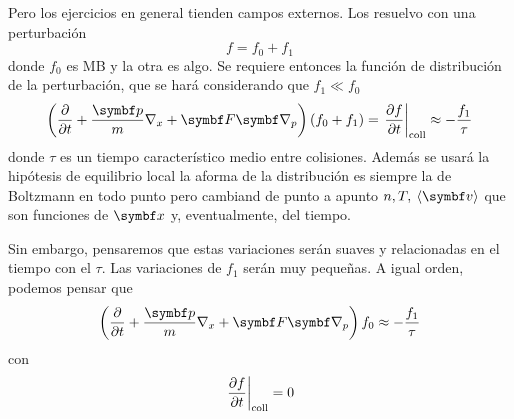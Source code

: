 \documentclass[10pt,oneside]{CBFT_book}
\begin{document}
Pero los ejercicios en general tienden campos externos. Los resuelvo con una perturbación
\[
	f = f_0 + f_1
\]
donde $f_0$ es MB y la otra es algo. Se requiere entonces la función de distribución de la perturbación,
que se hará considerando que $f_1 \ll f_0$
\[
	\left( \dpar{}{t} + \frac{\vbp}{m} \nabla_x + \vb{F}\Nabla_p \right) (f_0+f_1) =
	\dpare{f}{t}{\text{coll}} \approx -\frac{f_1}{\tau}
\]
donde $\tau$ es un tiempo característico medio entre colisiones.
Además se usará la hipótesis de equilibrio local la aforma de la distribución es siempre la de Boltzmann
en todo punto pero cambiand de punto a apunto $n, T, \vm{\vbv}$ que son funciones de $\vbx$ y, eventualmente,
del tiempo.

Sin embargo, pensaremos que estas variaciones serán suaves y relacionadas en el tiempo con el $\tau$.
Las variaciones de $f_1$ serán muy pequeñas. A igual orden, podemos pensar que
\[
	\left( \dpar{}{t} + \frac{\vbp}{m} \nabla_x + \vb{F}\Nabla_p \right) f_0 \approx -\frac{f_1}{\tau}
\]
con 
\[
	\left.\frac{\partial^{\hspace{-0.05em}} {f}}{\partial {t}^{\hspace{-0.05em}}}\right|_{\text{coll}}  = 0
\]
\end{document}
